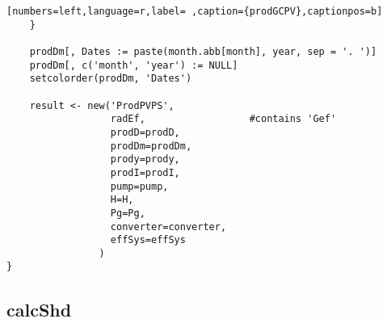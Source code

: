 \begin{lstlisting}[numbers=left,language=r,label= ,caption={prodGCPV},captionpos=b]
    }

    prodDm[, Dates := paste(month.abb[month], year, sep = '. ')]
    prodDm[, c('month', 'year') := NULL]
    setcolorder(prodDm, 'Dates')

    result <- new('ProdPVPS',
                  radEf,                  #contains 'Gef'
                  prodD=prodD,
                  prodDm=prodDm,
                  prody=prody,
                  prodI=prodI,
                  pump=pump,
                  H=H,
                  Pg=Pg,
                  converter=converter,
                  effSys=effSys
                )
}
\end{lstlisting}
\subsection{calcShd}
\label{sec:org1408ffa}
